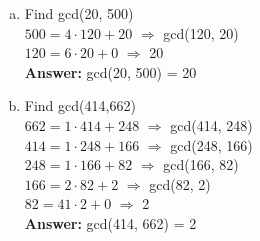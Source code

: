 \documentclass [12pt]{article}
\begin{document}
\begin{enumerate}[a)]
    \item Find gcd(20, 500)\\
    $500 = 4\cdot 120 + 20$ $\Rightarrow$ gcd(120, 20)\\
    $120 = 6\cdot 20 + 0$ $\Rightarrow$ 20\\
    \textbf{Answer: }gcd(20, 500) = 20
    \item Find gcd(414,662)\\
    $662 = 1\cdot 414 + 248$ $\Rightarrow$ gcd(414, 248)\\
    $414 = 1\cdot 248 + 166$ $\Rightarrow$ gcd(248, 166)\\
    $248 = 1\cdot 166 + 82$ $\Rightarrow$ gcd(166, 82)\\
    $166 = 2\cdot 82 + 2$ $\Rightarrow$ gcd(82, 2)\\
    $82 = 41\cdot 2 + 0$ $\Rightarrow$ 2\\
    \textbf{Answer: }gcd(414, 662) = 2
\end{enumerate}
\end{document}
